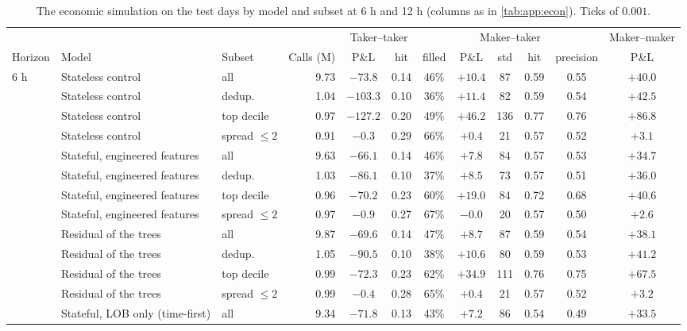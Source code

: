 \begin{table}[p]
\centering
\caption{The economic simulation on the test days by model and subset at 6 h and 12 h
(columns as in \cref{tab:app:econ}).  Ticks of $0.001$.}
\label{tab:app:econlong}
\footnotesize
\begin{fittable}\begin{tabular}{lllrcccccccc}
\toprule
& & & & \multicolumn{2}{c}{Taker--taker} & \multicolumn{5}{c}{Maker--taker} & Maker--maker \\
\cmidrule(lr){5-6}\cmidrule(lr){7-11}\cmidrule(lr){12-12}
Horizon & Model & Subset & Calls (M) & P\&L & hit & filled & P\&L & std & hit & precision & P\&L \\
\midrule
6 h & Stateless control & all & 9.73 & $-73.8$ & 0.14 & 46\% & $+10.4$ & 87 & 0.59 & 0.55 & $+40.0$ \\
 & Stateless control & dedup. & 1.04 & $-103.3$ & 0.10 & 36\% & $+11.4$ & 82 & 0.59 & 0.54 & $+42.5$ \\
 & Stateless control & top decile & 0.97 & $-127.2$ & 0.20 & 49\% & $+46.2$ & 136 & 0.77 & 0.76 & $+86.8$ \\
 & Stateless control & spread $\le 2$ & 0.91 & $-0.3$ & 0.29 & 66\% & $+0.4$ & 21 & 0.57 & 0.52 & $+3.1$ \\
 & Stateful, engineered features & all & 9.63 & $-66.1$ & 0.14 & 46\% & $+7.8$ & 84 & 0.57 & 0.53 & $+34.7$ \\
 & Stateful, engineered features & dedup. & 1.03 & $-86.1$ & 0.10 & 37\% & $+8.5$ & 73 & 0.57 & 0.51 & $+36.0$ \\
 & Stateful, engineered features & top decile & 0.96 & $-70.2$ & 0.23 & 60\% & $+19.0$ & 84 & 0.72 & 0.68 & $+40.6$ \\
 & Stateful, engineered features & spread $\le 2$ & 0.97 & $-0.9$ & 0.27 & 67\% & $-0.0$ & 20 & 0.57 & 0.50 & $+2.6$ \\
 & Residual of the trees & all & 9.87 & $-69.6$ & 0.14 & 47\% & $+8.7$ & 87 & 0.59 & 0.54 & $+38.1$ \\
 & Residual of the trees & dedup. & 1.05 & $-90.5$ & 0.10 & 38\% & $+10.6$ & 80 & 0.59 & 0.53 & $+41.2$ \\
 & Residual of the trees & top decile & 0.99 & $-72.3$ & 0.23 & 62\% & $+34.9$ & 111 & 0.76 & 0.75 & $+67.5$ \\
 & Residual of the trees & spread $\le 2$ & 0.99 & $-0.4$ & 0.28 & 65\% & $+0.4$ & 21 & 0.57 & 0.52 & $+3.2$ \\
 & Stateful, LOB only (time-first) & all & 9.34 & $-71.8$ & 0.13 & 43\% & $+7.2$ & 86 & 0.54 & 0.49 & $+33.5$ \\

\end{tabular}
\end{fittable}
\end{table}
